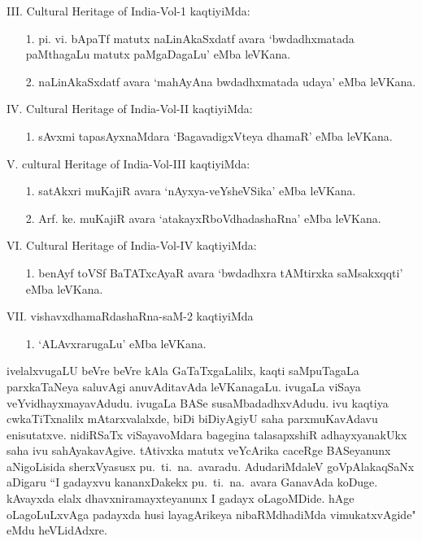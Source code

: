 \eject

{\rm III. Cultural Heritage of India-Vol-1} kaqtiyiMda:
\begin{itemize}
\item[{\rm 1.}] pi. vi. bApaTf matutx naLinAkaSxdatf avara `bwdadhxmatada paMthagaLu matutx paMgaDagaLu' eMba leVKana.

\item[{\rm 2.}] naLinAkaSxdatf avara `mahAyAna bwdadhxmatada udaya' eMba leVKana.
\end{itemize}

{\rm IV. Cultural Heritage of India-Vol-II} kaqtiyiMda:
\begin{itemize}
\item[{\rm 1.}] sAvxmi tapasAyxnaMdara `BagavadigxVteya dhamaR' eMba leVKana.
\end{itemize}

{\rm V. cultural Heritage of India-Vol-III} kaqtiyiMda:
\begin{itemize}
\item[{\rm 1.}] satAkxri muKajiR avara `nAyxya-veYsheVSika' eMba leVKana.

\item[{\rm 2.}] Arf. ke. muKajiR avara `atakayxRboVdhadashaRna' eMba leVKana.
\end{itemize}

{\rm VI. Cultural Heritage of India-Vol-IV} kaqtiyiMda:
\begin{itemize}
\item[{\rm 1.}] benAyf toVSf BaTATxcAyaR avara `bwdadhxra tAMtirxka saMsakxqqti' eMba leVKana.
\end{itemize}

{\rm VII.} vishavxdhamaRdashaRna-saM-2 kaqtiyiMda
\begin{itemize}
\item[{\rm 1.}] `ALAvxrarugaLu' eMba leVKana.
\end{itemize}

ivelalxvugaLU beVre beVre kAla GaTaTxgaLalilx, kaqti saMpuTagaLa parxkaTaNeya saluvAgi anuvAditavAda leVKanagaLu. ivugaLa viSaya veYvidhayxmayavAdudu. ivugaLa BASe susaMbadadhxvAdudu. ivu kaqtiya cwkaTiTxnalilx mAtarxvalalxde, biDi biDiyAgiyU saha parxmuKavAdavu enisutatxve. nidiRSaTx viSayavoMdara bagegina talasapxshiR adhayxyanakUkx saha ivu sahAyakavAgive. tAtivxka matutx veYcArika caceRge BASeyanunx aNigoLisida sherxVyasusx pu.~ti.~na.~avaradu. AdudariMdaleV goVpAlakaqSaNx aDigaru ``I gadayxvu kananxDakekx pu.~ti.~na.~avara GanavAda koDuge. kAvayxda elalx dhavxniramayxteyanunx I gadayx oLagoMDide. hAge oLagoLuLxvAga padayxda husi layagArikeya nibaRMdhadiMda vimukatxvAgide" eMdu heVLidAdxre.

